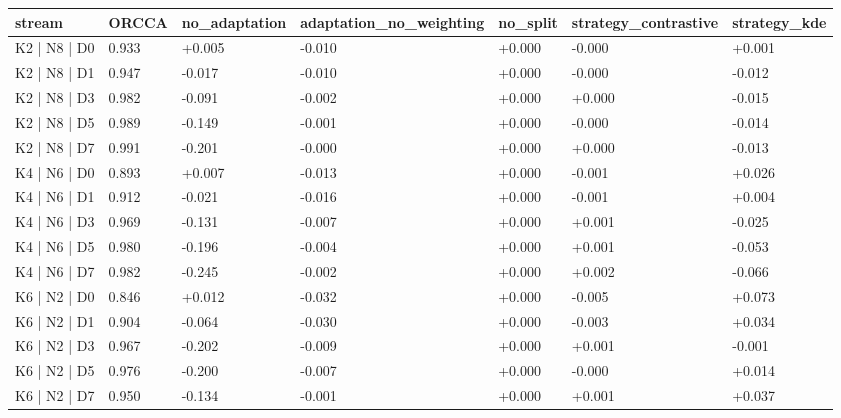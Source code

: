 \begin{tabular}{lllllll}
\hline
 stream       & ORCCA   & no\_adaptation   & adaptation\_no\_weighting   & no\_split   & strategy\_contrastive   & strategy\_kde   \\
\hline
 K2 | N8 | D0 & 0.933   & +0.005          & -0.010                    & +0.000     & -0.000                 & +0.001         \\
 K2 | N8 | D1 & 0.947   & -0.017          & -0.010                    & +0.000     & -0.000                 & -0.012         \\
 K2 | N8 | D3 & 0.982   & -0.091          & -0.002                    & +0.000     & +0.000                 & -0.015         \\
 K2 | N8 | D5 & 0.989   & -0.149          & -0.001                    & +0.000     & -0.000                 & -0.014         \\
 K2 | N8 | D7 & 0.991   & -0.201          & -0.000                    & +0.000     & +0.000                 & -0.013         \\
 K4 | N6 | D0 & 0.893   & +0.007          & -0.013                    & +0.000     & -0.001                 & +0.026         \\
 K4 | N6 | D1 & 0.912   & -0.021          & -0.016                    & +0.000     & -0.001                 & +0.004         \\
 K4 | N6 | D3 & 0.969   & -0.131          & -0.007                    & +0.000     & +0.001                 & -0.025         \\
 K4 | N6 | D5 & 0.980   & -0.196          & -0.004                    & +0.000     & +0.001                 & -0.053         \\
 K4 | N6 | D7 & 0.982   & -0.245          & -0.002                    & +0.000     & +0.002                 & -0.066         \\
 K6 | N2 | D0 & 0.846   & +0.012          & -0.032                    & +0.000     & -0.005                 & +0.073         \\
 K6 | N2 | D1 & 0.904   & -0.064          & -0.030                    & +0.000     & -0.003                 & +0.034         \\
 K6 | N2 | D3 & 0.967   & -0.202          & -0.009                    & +0.000     & +0.001                 & -0.001         \\
 K6 | N2 | D5 & 0.976   & -0.200          & -0.007                    & +0.000     & -0.000                 & +0.014         \\
 K6 | N2 | D7 & 0.950   & -0.134          & -0.001                    & +0.000     & +0.001                 & +0.037         \\
\hline
\end{tabular}